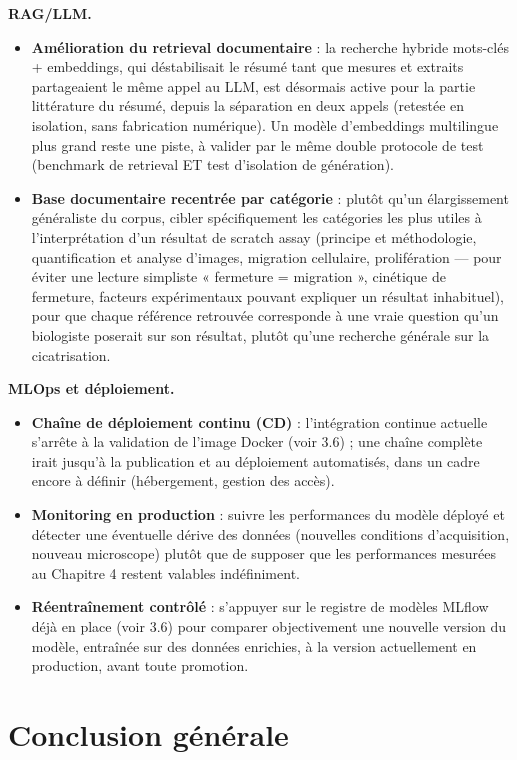 \documentclass[12pt,a4paper]{report}
\begin{document}
\textbf{RAG/LLM.}
\begin{itemize}
\item \textbf{Amélioration du retrieval documentaire} : la recherche hybride mots-clés + embeddings, qui déstabilisait le résumé tant que mesures et extraits partageaient le même appel au LLM, est désormais active pour la partie littérature du résumé, depuis la séparation en deux appels (retestée en isolation, sans fabrication numérique). Un modèle d'embeddings multilingue plus grand reste une piste, à valider par le même double protocole de test (benchmark de retrieval ET test d'isolation de génération).
\item \textbf{Base documentaire recentrée par catégorie} : plutôt qu'un élargissement généraliste du corpus, cibler spécifiquement les catégories les plus utiles à l'interprétation d'un résultat de scratch assay (principe et méthodologie, quantification et analyse d'images, migration cellulaire, prolifération --- pour éviter une lecture simpliste « fermeture = migration », cinétique de fermeture, facteurs expérimentaux pouvant expliquer un résultat inhabituel), pour que chaque référence retrouvée corresponde à une vraie question qu'un biologiste poserait sur son résultat, plutôt qu'une recherche générale sur la cicatrisation.
\end{itemize}

\textbf{MLOps et déploiement.}
\begin{itemize}
\item \textbf{Chaîne de déploiement continu (CD)} : l'intégration continue actuelle s'arrête à la validation de l'image Docker (voir 3.6) ; une chaîne complète irait jusqu'à la publication et au déploiement automatisés, dans un cadre encore à définir (hébergement, gestion des accès).
\item \textbf{Monitoring en production} : suivre les performances du modèle déployé et détecter une éventuelle dérive des données (nouvelles conditions d'acquisition, nouveau microscope) plutôt que de supposer que les performances mesurées au Chapitre 4 restent valables indéfiniment.
\item \textbf{Réentraînement contrôlé} : s'appuyer sur le registre de modèles MLflow déjà en place (voir 3.6) pour comparer objectivement une nouvelle version du modèle, entraînée sur des données enrichies, à la version actuellement en production, avant toute promotion.
\end{itemize}

\section{Conclusion générale}
\end{document}
